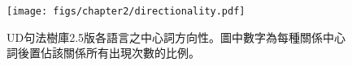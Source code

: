 \begin{figure}[htbp]
    \centering
        \texttt{[image: figs/chapter2/directionality.pdf]}
    \caption{UD句法樹庫2.5版各語言之中心詞方向性。圖中數字為每種關係中心詞後置佔該關係所有出現次數的比例。}
    \label{fig:udv2.5-head-dir}
\end{figure}
